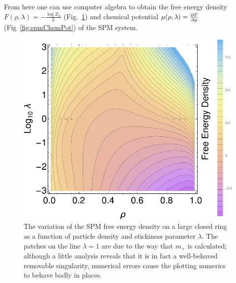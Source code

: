 From here one can use computer algebra to obtain the free energy density
$
 F(\rho, \lambda) = - \frac{\log{Z_L}}{L}
$
(Fig.~\ref{fig:spmFreeEnergy}) and chemical potential $\mu (\rho, \lambda) = \frac{\partial F}{\partial \rho}$
(Fig~\ref{fig:spmChemPot}) of the SPM system. 
\begin{figure}[h!]
 \caption[The free energy density of the SPM on a closed ring, as a function of density
 and $\lambda$.]{\label{fig:spmFreeEnergy} 
 The variation of the SPM free energy density on a large closed ring as a function of particle 
 density and stickiness parameter $\lambda$. The patches on the line $\lambda=1$ are
 due to the way that $m_+$ is calculated; although a little analysis reveals that it is in fact a
 well-behaved removable singularity, numerical errors cause the plotting numerics to behave
 badly in places.
 }
  \begin{center}
 \includegraphics[width=1.0\textwidth]{analytics/images/spmFreeEnergy}
  \end{center}
\end{figure}

